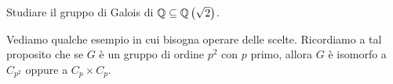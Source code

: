 
\begin{eser}
Studiare il gruppo di Galois di \(\mathbb{Q} \subseteq \mathbb{Q}\left(\sqrt2\right)\).
\end{eser}

Vediamo qualche esempio in cui bisogna operare delle scelte. Ricordiamo a tal proposito che se \(G\) è un gruppo di ordine \(p^2\) con \(p\) primo, allora \(G\) è isomorfo a \(C_{p^2}\) oppure a \(C_p \times C_p\).

